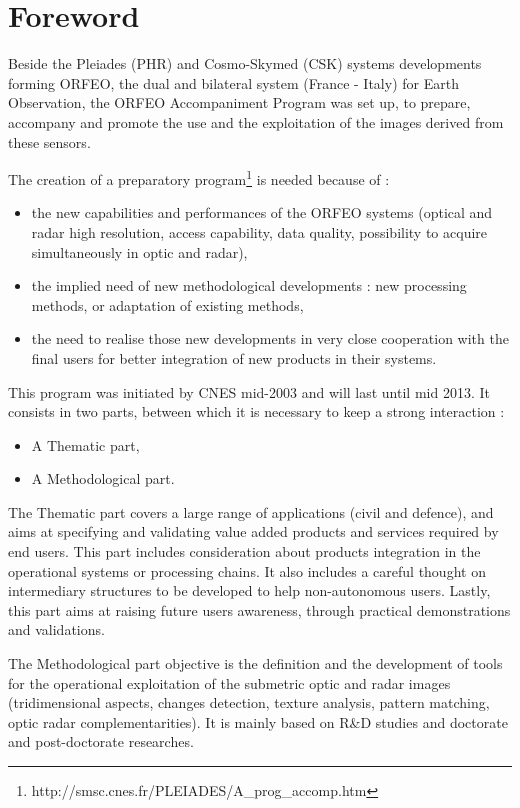 \chapter*{Foreword}
\noindent


Beside the Pleiades (PHR) and Cosmo-Skymed (CSK) systems developments
forming ORFEO, the dual and bilateral system (France - Italy) for
Earth Observation, the ORFEO Accompaniment Program was set up, to
prepare, accompany and promote the use and the exploitation of the
images derived from these sensors.

The creation of a preparatory
program\footnote{http://smsc.cnes.fr/PLEIADES/A\_prog\_accomp.htm} is
needed because of :
\begin{itemize}
\item the new capabilities and performances of the ORFEO systems
  (optical and radar high resolution, access capability, data quality,
  possibility to acquire simultaneously in optic and radar),
\item the implied need of new methodological developments : new
  processing methods, or adaptation of existing methods,
\item the need to realise those new developments in very close
  cooperation with the final users for better integration of new
  products in their systems.

\end{itemize}

This program was initiated by CNES mid-2003 and will last until mid
2013.  It consists in two parts, between which it is necessary to keep
a strong interaction :
\begin{itemize}
\item A Thematic part,
\item A Methodological part.
\end{itemize}

The Thematic part covers a large range of applications (civil and
defence), and aims at specifying and validating value added products
and services required by end users. This part includes consideration
about products integration in the operational systems or processing
chains. It also includes a careful thought on intermediary structures
to be developed to help non-autonomous users. Lastly, this part aims
at raising future users awareness, through practical demonstrations
and validations.

The Methodological part objective is the definition and the
development of tools for the operational exploitation of the
submetric optic and radar images (tridimensional aspects, changes
detection, texture analysis, pattern matching, optic radar
complementarities). It is mainly based on R\&D studies and doctorate
and post-doctorate researches.

